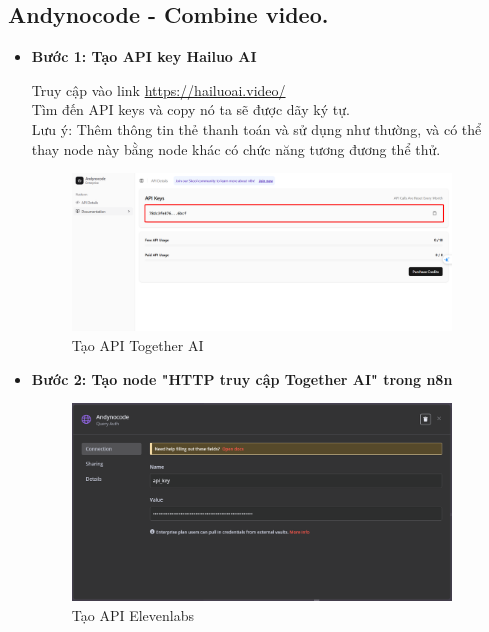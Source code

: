 \subsection{Andynocode - Combine video.}
\begin{itemize}[label=]
    \item \textbf{Bước 1: Tạo API key Hailuo AI} 
    
    Truy cập vào link \url{https://hailuoai.video/} \\ 
    Tìm đến API keys và copy nó ta sẽ được dãy ký tự.\\
    Lưu ý: Thêm thông tin thẻ thanh toán và sử dụng như thường, và có thể thay node này bằng node khác có chức năng tương đương thể thử.\\
    
    \begin{figure}[H]
    \centering
    \includegraphics[width=0.95\textwidth]{images/Andy02.png}
    \caption{Tạo API Together AI}
    
    \end{figure}
    \item \textbf{Bước 2: Tạo node "HTTP truy cập Together AI" trong n8n}\\
    \begin{figure}[H]
    \centering
    \includegraphics[width=0.95\textwidth]{images/Andy01.png}
    \caption{Tạo API Elevenlabs}
    

\end{figure}
\end{itemize}
